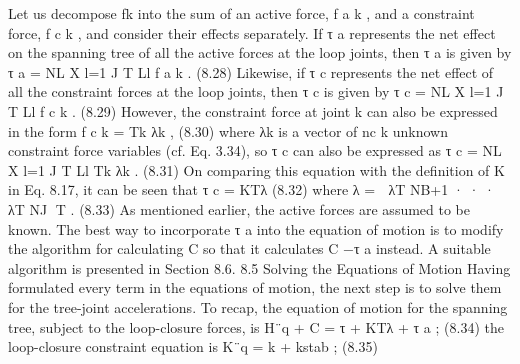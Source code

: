 Let us decompose fk into the sum of an active force, f a k , and a constraint force, f c k , and consider their effects separately. If τ a represents the net effect on the spanning tree of all the active forces at the loop joints, then τ a is given by τ a = NL X l=1 J T Ll f a k . (8.28) Likewise, if τ c represents the net effect of all the constraint forces at the loop joints, then τ c is given by τ c = NL X l=1 J T Ll f c k . (8.29) However, the constraint force at joint k can also be expressed in the form f c k = Tk λk , (8.30) where λk is a vector of nc k unknown constraint force variables (cf. Eq. 3.34), so τ c can also be expressed as τ c = NL X l=1 J T Ll Tk λk . (8.31) On comparing this equation with the definition of K in Eq. 8.17, it can be seen that τ c = KTλ (8.32) where λ =  λT NB+1 · · · λT NJ T . (8.33) As mentioned earlier, the active forces are assumed to be known. The best way to incorporate τ a into the equation of motion is to modify the algorithm for calculating C so that it calculates C −τ a instead. A suitable algorithm is presented in Section 8.6. 8.5 Solving the Equations of Motion Having formulated every term in the equations of motion, the next step is to solve them for the tree-joint accelerations. To recap, the equation of motion for the spanning tree, subject to the loop-closure forces, is H¨q + C = τ + KTλ + τ a ; (8.34) the loop-closure constraint equation is K¨q = k + kstab ; (8.35)

